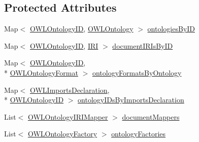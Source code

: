 \subsection*{Protected Attributes}
\begin{DoxyCompactItemize}
\item 
Map$<$ \hyperlink{classorg_1_1semanticweb_1_1owlapi_1_1model_1_1_o_w_l_ontology_i_d}{O\-W\-L\-Ontology\-I\-D}, \hyperlink{interfaceorg_1_1semanticweb_1_1owlapi_1_1model_1_1_o_w_l_ontology}{O\-W\-L\-Ontology} $>$ \hyperlink{classuk_1_1ac_1_1manchester_1_1cs_1_1owl_1_1owlapi_1_1_o_w_l_ontology_manager_impl_a83f592f96a4623dbabf21cfd8d1078ac}{ontologies\-By\-I\-D}
\item 
Map$<$ \hyperlink{classorg_1_1semanticweb_1_1owlapi_1_1model_1_1_o_w_l_ontology_i_d}{O\-W\-L\-Ontology\-I\-D}, \hyperlink{classorg_1_1semanticweb_1_1owlapi_1_1model_1_1_i_r_i}{I\-R\-I} $>$ \hyperlink{classuk_1_1ac_1_1manchester_1_1cs_1_1owl_1_1owlapi_1_1_o_w_l_ontology_manager_impl_afe358a0a1bb009f5e7132747280a76cc}{document\-I\-R\-Is\-By\-I\-D}
\item 
Map$<$ \hyperlink{classorg_1_1semanticweb_1_1owlapi_1_1model_1_1_o_w_l_ontology_i_d}{O\-W\-L\-Ontology\-I\-D}, \\*
\hyperlink{classorg_1_1semanticweb_1_1owlapi_1_1model_1_1_o_w_l_ontology_format}{O\-W\-L\-Ontology\-Format} $>$ \hyperlink{classuk_1_1ac_1_1manchester_1_1cs_1_1owl_1_1owlapi_1_1_o_w_l_ontology_manager_impl_a314204caa0cfb624c2b1025f31664ff4}{ontology\-Formats\-By\-Ontology}
\item 
Map$<$ \hyperlink{interfaceorg_1_1semanticweb_1_1owlapi_1_1model_1_1_o_w_l_imports_declaration}{O\-W\-L\-Imports\-Declaration}, \\*
\hyperlink{classorg_1_1semanticweb_1_1owlapi_1_1model_1_1_o_w_l_ontology_i_d}{O\-W\-L\-Ontology\-I\-D} $>$ \hyperlink{classuk_1_1ac_1_1manchester_1_1cs_1_1owl_1_1owlapi_1_1_o_w_l_ontology_manager_impl_ad80c7adcfcee4112846bffc61eab0c03}{ontology\-I\-Ds\-By\-Imports\-Declaration}
\item 
List$<$ \hyperlink{interfaceorg_1_1semanticweb_1_1owlapi_1_1model_1_1_o_w_l_ontology_i_r_i_mapper}{O\-W\-L\-Ontology\-I\-R\-I\-Mapper} $>$ \hyperlink{classuk_1_1ac_1_1manchester_1_1cs_1_1owl_1_1owlapi_1_1_o_w_l_ontology_manager_impl_ac453259b6b67e33915176bc7089d1aa0}{document\-Mappers}
\item 
List$<$ \hyperlink{interfaceorg_1_1semanticweb_1_1owlapi_1_1model_1_1_o_w_l_ontology_factory}{O\-W\-L\-Ontology\-Factory} $>$ \hyperlink{classuk_1_1ac_1_1manchester_1_1cs_1_1owl_1_1owlapi_1_1_o_w_l_ontology_manager_impl_a90d25867cf9fe66f40adc6790592bcec}{ontology\-Factories}

\end{DoxyCompactItemize}
